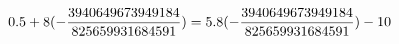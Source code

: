 \documentclass[preview]{standalone}
\begin{document}
\begin{align*}
\special{dvisvgm:raw <g id='unique000'>}0.5 + 8 (- \frac{3940649673949184}{825659931684591}) = 5.8 (- \frac{3940649673949184}{825659931684591}) - 10\special{dvisvgm:raw </g>}
\end{align*}
\end{document}
